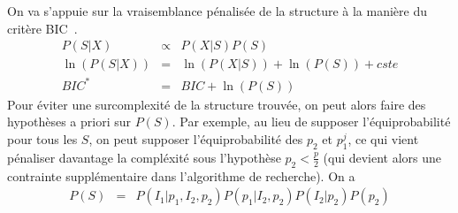 \documentclass[12pt]{article}
\begin{document}
		On va s'appuie sur la vraisemblance pénalisée de la structure à la manière du critère BIC~\cite{BIChuard}. 
		\begin{eqnarray}
		P(S|X)&\propto &P(X|S)P(S) \\
		\ln(P(S|X))&=&\ln(P(X|S))+\ln(P(S))+cste \\
		BIC^*&=&BIC +\ln(P(S)) \label{Bicstar}
	\end{eqnarray}	
	Pour éviter une surcomplexité de la structure trouvée, on peut alors faire des hypothèses a priori sur $P(S)$. Par exemple, au lieu de supposer l'équiprobabilité pour tous les $S$, on peut supposer l'équiprobabilité des $p_2$ et $p_1^j$, ce qui vient pénaliser davantage la compléxité sous l'hypothèse $p_2<\frac{p}{2}$ (qui devient alors une contrainte supplémentaire dans l'algorithme de recherche). 
	On a
	\begin{eqnarray}
		P(S)&=&P(I_1 | p_1,I_2,p_2)P(p_1|I_2,p_2)P(I_2|p_2)P(p_2) %
	\end{eqnarray}		
\end{document}
